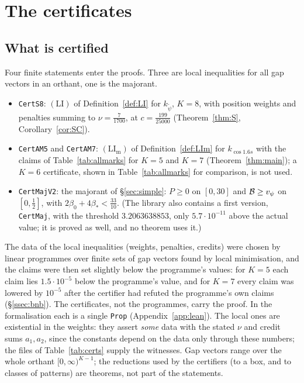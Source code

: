 \section{The certificates}\label{sec:cert}

\subsection{What is certified}
Four finite statements enter the proofs. Three are local inequalities for all gap vectors in an orthant, one is the majorant.
\begin{itemize}
\item \texttt{CertS8}: $(\mathrm{LI})$ of Definition~\ref{def:LI} for $k_{\tilde\psi}$, $K=8$, with position weights and penalties summing to
$\nu=\frac7{1700}$, at $c=\frac{199}{25000}$ (Theorem~\ref{thm:S}, Corollary~\ref{cor:SC}).
\item \texttt{CertAM5} and \texttt{CertAM7}: $(\mathrm{LI}_{\mathrm m})$ of Definition~\ref{def:LIm} for $k_{\cos1.6s}$ with the claims of
Table~\ref{tab:allmarks} for $K=5$ and $K=7$ (Theorem~\ref{thm:main}); a $K=6$ certificate, shown in Table~\ref{tab:allmarks} for comparison, is not used.
\item \texttt{CertMajV2}: the majorant of \S\ref{sec:simple}: $P\ge0$ on $[0,30]$ and $\mathcal B\ge v_\psi$ on $[0,\frac12]$, with $2\beta_0+4\beta_*<\frac{33}{10}$.
(The library also contains a first version, \texttt{CertMaj}, with the threshold $3.2063638853$, only $5.7\cdot10^{-11}$ above the
actual value; it is proved as well, and no theorem uses it.)
\end{itemize}
The data of the local inequalities (weights, penalties, credits) were chosen by linear programmes over finite sets of gap vectors found by
local minimisation, and the claims were then set slightly below the programme's values: for $K=5$ each claim lies $1.5\cdot10^{-5}$ below the programme's value,
and for $K=7$ every claim was lowered by $10^{-5}$ after the certifier had refuted the programme's own claims (\S\ref{ssec:bnb}). The
certificates, not the programmes, carry the proof. In the formalisation each is a single \texttt{Prop} (Appendix~\ref{app:lean}). The local ones are existential in the weights: they assert
\emph{some} data with the stated $\nu$ and credit sums $a_1,a_2$, since the constants depend on the data only through these numbers; the files
of Table~\ref{tab:certs} supply the witnesses. Gap vectors range over the whole orthant $[0,\infty)^{K-1}$; the reductions used by the
certifiers (to a box, and to classes of patterns) are theorems, not part of the statements.

